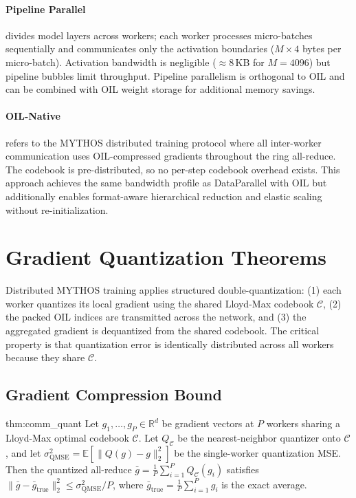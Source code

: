 \paragraph{Pipeline Parallel} divides model layers across workers; each worker processes micro-batches sequentially and communicates only the activation boundaries ($M \times 4$ bytes per micro-batch). Activation bandwidth is negligible ($\approx 8$\,KB for $M = 4096$) but pipeline bubbles limit throughput. Pipeline parallelism is orthogonal to OIL and can be combined with OIL weight storage for additional memory savings.

\paragraph{OIL-Native} refers to the MYTHOS distributed training protocol where all inter-worker communication uses OIL-compressed gradients throughout the ring all-reduce. The codebook is pre-distributed, so no per-step codebook overhead exists. This approach achieves the same bandwidth profile as DataParallel with OIL but additionally enables format-aware hierarchical reduction and elastic scaling without re-initialization.

\section{Gradient Quantization Theorems}
\label{sec:grad_quant}

Distributed MYTHOS training applies structured double-quantization: (1) each worker quantizes its local gradient using the shared Lloyd-Max codebook $\mathcal{C}$, (2) the packed OIL indices are transmitted across the network, and (3) the aggregated gradient is dequantized from the shared codebook. The critical property is that quantization error is identically distributed across all workers because they share $\mathcal{C}$.

\subsection{Gradient Compression Bound}
\label{sec:grad_comp_bound}

\begin{mythm}{thm:comm_quant}
Let $g_1, \dots, g_P \in \mathbb{R}^d$ be gradient vectors at $P$ workers sharing a Lloyd-Max optimal codebook $\mathcal{C}$. Let $Q_{\mathcal{C}}$ be the nearest-neighbor quantizer onto $\mathcal{C}$, and let $\sigma^2_{\text{QMSE}} = \mathbb{E}[\|Q(g) - g\|^2_2]$ be the single-worker quantization MSE. Then the quantized all-reduce $\bar{g} = \frac{1}{P} \sum_{i=1}^P Q_{\mathcal{C}}(g_i)$ satisfies $\|\bar{g} - \bar{g}_{\text{true}}\|^2_2 \leq \sigma^2_{\text{QMSE}} / P$, where $\bar{g}_{\text{true}} = \frac{1}{P} \sum_{i=1}^P g_i$ is the exact average.
\end{mythm}

